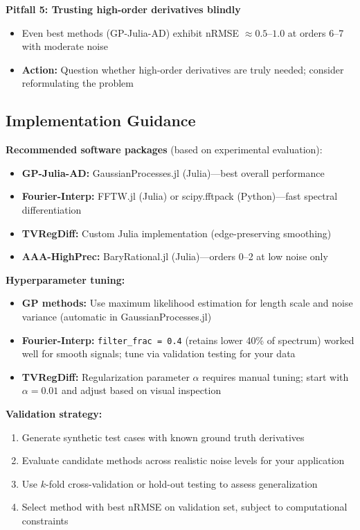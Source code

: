 \textbf{Pitfall 5: Trusting high-order derivatives blindly}
\begin{itemize}
    \item Even best methods (GP-Julia-AD) exhibit nRMSE $\approx 0.5$--$1.0$ at orders 6--7 with moderate noise
    \item \textbf{Action:} Question whether high-order derivatives are truly needed; consider reformulating the problem
\end{itemize}

\subsection{Implementation Guidance}
\label{sec:implementation}

\textbf{Recommended software packages} (based on experimental evaluation):
\begin{itemize}
    \item \textbf{GP-Julia-AD:} GaussianProcesses.jl (Julia)—best overall performance
    \item \textbf{Fourier-Interp:} FFTW.jl (Julia) or scipy.fftpack (Python)—fast spectral differentiation
    \item \textbf{TVRegDiff:} Custom Julia implementation (edge-preserving smoothing)
    \item \textbf{AAA-HighPrec:} BaryRational.jl (Julia)—orders 0--2 at low noise only
\end{itemize}

\textbf{Hyperparameter tuning:}
\begin{itemize}
    \item \textbf{GP methods:} Use maximum likelihood estimation for length scale and noise variance (automatic in GaussianProcesses.jl)
    \item \textbf{Fourier-Interp:} \texttt{filter\_frac = 0.4} (retains lower 40\% of spectrum) worked well for smooth signals; tune via validation testing for your data
    \item \textbf{TVRegDiff:} Regularization parameter $\alpha$ requires manual tuning; start with $\alpha = 0.01$ and adjust based on visual inspection
\end{itemize}

\textbf{Validation strategy:}
\begin{enumerate}
    \item Generate synthetic test cases with known ground truth derivatives
    \item Evaluate candidate methods across realistic noise levels for your application
    \item Use $k$-fold cross-validation or hold-out testing to assess generalization
    \item Select method with best nRMSE on validation set, subject to computational constraints
\end{enumerate}
